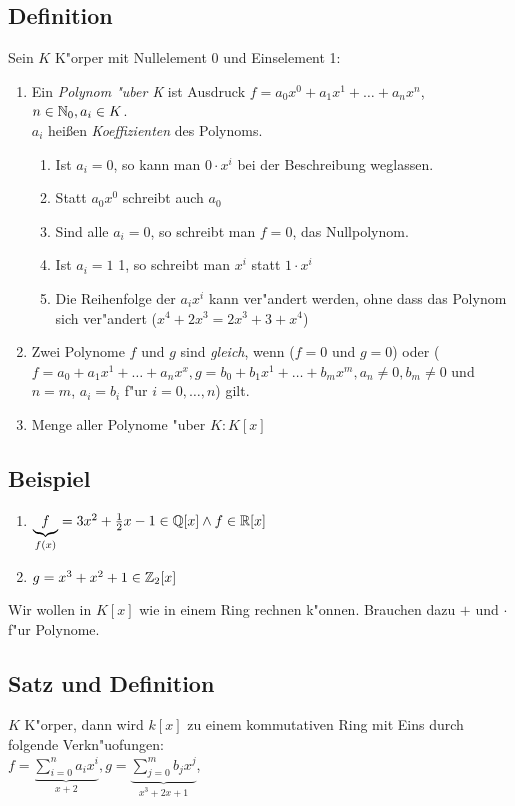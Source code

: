 \subsection[Definition: Polynom]{Definition}
Sein $K$ K"orper mit Nullelement $0$ und Einselement 1:
\begin{enumerate}
	\item
	Ein \emph{Polynom "uber K} ist Ausdruck $f=a_0x^0+a_1x^1+\dots + a_nx^n$, $n\in \mathbb{N}_0, a_i\in K$.\\
	$a_i$ heißen \emph{Koeffizienten} des Polynoms.
	\begin{enumerate}
		\item
		Ist $a_i=0$, so kann man $0 \cdot x^i$ bei der Beschreibung weglassen.
		\item
		Statt $a_0x^0$ schreibt auch $a_0$
		\item
		Sind alle $a_i=0$, so schreibt man $f=0$, das Nullpolynom.
		\item
		Ist $a_i =1$ 1, so schreibt man $x^i$ statt $1 \cdot x^i$
		\item
		Die Reihenfolge der $a_ix^i$ kann ver"andert werden, ohne dass das Polynom sich ver"andert ($x^4+2x^3= 2x^3 +  3 + x^4$)
	\end{enumerate} 
	\item
	Zwei Polynome $f$ und $g$ sind \emph{gleich}, wenn ($f=0$ und $g=0$) oder ($f=a_0 + a_1x^1+ \dots + a_nx^x, g=b_0+b_1x^1+ \dots + b_mx^m, a_n \neq  0, b_m \neq 0$ und $n=m$, $a_i = b_i$ f"ur $i=0, \dots , n$) gilt.
	\item
	Menge aller Polynome "uber $K: K[x]$
\end{enumerate} 

\subsection{Beispiel}
\begin{enumerate}
	\item
	$\underbrace{f}_{f(x)} = 3x^2 + \frac{1}{2}x -1 \in \mathbb{Q} [x] \land f \in \mathbb{R} [x]$
	\item
	$g= x^3 + x^2 +1 \in \mathbb{Z}_2[x] $ 
\end{enumerate}
Wir wollen in $K[x]$ wie in einem Ring rechnen k"onnen. Brauchen dazu $+$ und $\cdot$ f"ur Polynome.

\subsection[Satz und Definition: Polynomring]{Satz und Definition}
$K$ K"orper, dann wird $k[x]$ zu einem kommutativen Ring mit Eins durch folgende Verkn"uofungen:\\
$f= \underbrace{\sum_{i=0}^{n} a_ix^i}_{x+2}, g=\underbrace{\sum_{j=0}^{m} b_j x^j}_{x^3 + 2x + 1}$,

